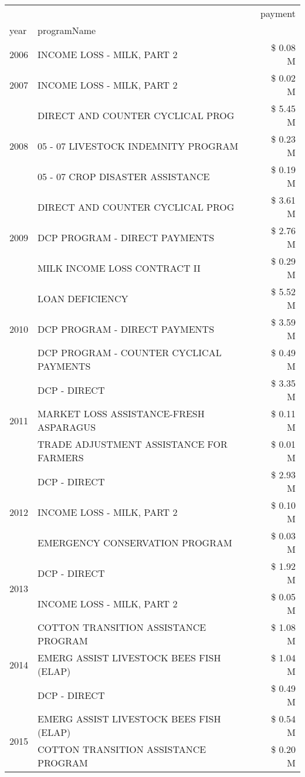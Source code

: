 \begin{tabular}{llr}
\toprule
 &  & payment \\
year & programName &  \\
\midrule
2006 & INCOME LOSS - MILK, PART 2 & \$ 0.08 M \\
\cline{1-3}
2007 & INCOME LOSS - MILK, PART 2 & \$ 0.02 M \\
\cline{1-3}
\multirow[t]{3}{*}{2008} & DIRECT AND COUNTER CYCLICAL PROG & \$ 5.45 M \\
 & 05 - 07 LIVESTOCK INDEMNITY PROGRAM & \$ 0.23 M \\
 & 05 - 07 CROP DISASTER ASSISTANCE & \$ 0.19 M \\
\cline{1-3}
\multirow[t]{3}{*}{2009} & DIRECT AND COUNTER CYCLICAL PROG & \$ 3.61 M \\
 & DCP PROGRAM - DIRECT PAYMENTS & \$ 2.76 M \\
 & MILK INCOME LOSS CONTRACT II & \$ 0.29 M \\
\cline{1-3}
\multirow[t]{3}{*}{2010} & LOAN DEFICIENCY & \$ 5.52 M \\
 & DCP PROGRAM - DIRECT PAYMENTS & \$ 3.59 M \\
 & DCP PROGRAM - COUNTER CYCLICAL PAYMENTS & \$ 0.49 M \\
\cline{1-3}
\multirow[t]{3}{*}{2011} & DCP - DIRECT & \$ 3.35 M \\
 & MARKET LOSS ASSISTANCE-FRESH ASPARAGUS & \$ 0.11 M \\
 & TRADE ADJUSTMENT ASSISTANCE FOR FARMERS & \$ 0.01 M \\
\cline{1-3}
\multirow[t]{3}{*}{2012} & DCP - DIRECT & \$ 2.93 M \\
 & INCOME LOSS - MILK, PART 2 & \$ 0.10 M \\
 & EMERGENCY CONSERVATION PROGRAM & \$ 0.03 M \\
\cline{1-3}
\multirow[t]{2}{*}{2013} & DCP - DIRECT & \$ 1.92 M \\
 & INCOME LOSS - MILK, PART 2 & \$ 0.05 M \\
\cline{1-3}
\multirow[t]{3}{*}{2014} & COTTON TRANSITION ASSISTANCE PROGRAM & \$ 1.08 M \\
 & EMERG ASSIST LIVESTOCK BEES FISH (ELAP) & \$ 1.04 M \\
 & DCP - DIRECT & \$ 0.49 M \\
\cline{1-3}
\multirow[t]{3}{*}{2015} & EMERG ASSIST LIVESTOCK BEES FISH (ELAP) & \$ 0.54 M \\
 & COTTON TRANSITION ASSISTANCE PROGRAM & \$ 0.20 M \\

\end{tabular}
